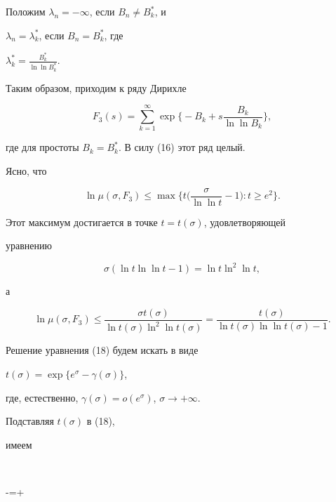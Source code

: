 \begin{pf}
 


Положим $\lambda_n=-\infty$, если $B_n\ne B^*_k$, и 


$\lambda_n=\lambda^*_k$, если $B_n=B^*_k$, где 


$\lambda^*_k=\frac{B^*_k}{\ln\ln B^*_k}$. 


Таким образом, приходим к ряду Дирихле 


$$ 


F_3(s)=\sum^\infty_{k=1}\exp\biggl\{-B_k+s 


\frac{B_k}{\ln\ln B_k}\biggr\}, 


$$ 


где для простоты $B_k=B^*_k$. В силу (16) этот ряд целый. 


Ясно, что 


$$ 


\ln\mu(\sigma,F_3)\le\max\biggl\{t 


\biggl(\frac{\sigma}{\ln\ln t}-1 \biggr):t\ge e^2\biggr\}. 


$$ 


Этот максимум достигается в точке $t=t(\sigma)$, удовлетворяющей 


уравнению 


\begin{equation} 


\sigma(\ln t\ln\ln t-1)=\ln t\ln^2\ln t, 


\end{equation} 


а 


\begin{equation} 


\ln\mu(\sigma,F_3)\le 


\frac{\sigma t(\sigma)}{\ln t(\sigma)\ln^2\ln t(\sigma)}= 


\frac{t(\sigma)}{\ln t(\sigma)\ln\ln t(\sigma)-1}. 


\end{equation} 


Решение уравнения (18) будем искать в виде 


$t(\sigma)=\exp\{e^\sigma-\gamma(\sigma)\}$, 


где, естественно, $\gamma(\sigma)=o(e^\sigma)$, $\sigma\to+\infty$. 


Подставляя $t(\sigma)$ в (18), 


имеем 


$$ 


\sigma-=\sigma+\ln 



\end{pf}
